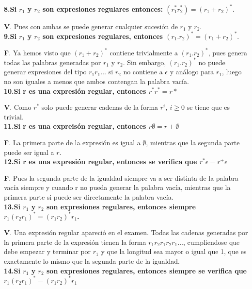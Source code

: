 \documentclass[a4paper,11pt]{article}
\begin{document}
\textbf{8.Si $r_1$ y $r_2$ son expresiones regulares entonces: $(r_1^*r_2^*)=(r_1+r_2)^*$}.

\textbf{V}. Pues con ambas se puede generar cualquier sucesión de $r_1$ y $r_2$. \\

\textbf{9.Si $r_1$ y $r_2$ son expresiones regulares, entonces $(r_1.r_2)^*=(r_1 +r_2)^*$}.

\textbf{F}. Ya hemos visto que $(r_1 +r_2)^*$ contiene trivialmente a $(r_1.r_2)^*$, pues genera todas las palabras generadas por $r_1$ y $r_2$. Sin embargo, $(r_1.r_2)^*$ no puede generar expresiones del tipo $r_1r_1\ldots$ si $r_2$ no contiene a $\epsilon$ y análogo para $r_1$, luego no son iguales a menos que ambos contengan la palabra vacía. \\

\textbf{10.Si r es una expresión regular, entonces $r^*r^*=r*$}

\textbf{V}. Como $r^*$ solo puede generar cadenas de la forma $r^i, \> i \geq 0$ se tiene que es trivial. \\

\textbf{11.Si r es una expreisón regular, entonces $r\emptyset=r+\emptyset$}

\textbf{F}. La primera parte de la expresión es igual a $\emptyset$, mientras que la segunda parte puede ser igual a $r$. \\

\textbf{12.Si r es una expresión regular, entonces se verifica que $r^*\epsilon=r^+\epsilon$}

\textbf{F}. Pues la segunda parte de la igualdad siempre va a ser distinta de la palabra vacía siempre y cuando r no pueda generar la palabra vacía, mientras que la primera parte si puede ser directamente la palabra vacía. \\

\textbf{13.Si $r_1$ y $r_2$ son expresiones regulares, entonces siempre $r_1(r_2r_1)^*=(r_1r_2)^*r_1$.}

\textbf{V}. Una expresión regular apareció en el examen. Todas las cadenas generadas por la primera parte de la expresión tienen la forma $r_1r_2r_1r_2r_1\ldots$, cumpliendose que debe empezar y terminar por $r_1$ y que la longitud sea mayor o igual que 1, que es exactamente lo mismo que la segunda parte de la igualdad. \\

\textbf{14.Si $r_1$ y $r_2$ son expresiones regulares, entonces siempre se verifica que $r_1(r_2r_1)^*=(r_1r_2)^*r_1$}
\end{document}
